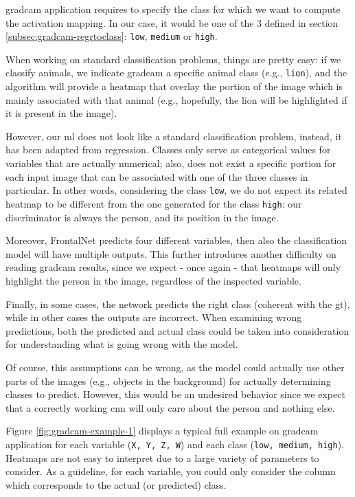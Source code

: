 \gls{gradcam} application requires to specify the class for which we want to compute the activation mapping. In our case, it would be one of the 3 defined in section \ref{subsec:gradcam-regrtoclass}: \texttt{low}, \texttt{medium} or \texttt{high}. 

When working on standard classification problems, things are pretty easy: if we classify animals, we indicate \gls{gradcam} a specific animal class (e.g., \texttt{lion}), and the algorithm will provide a heatmap that overlay the portion of the image which is mainly associated with that animal (e.g., hopefully, the lion will be highlighted if it is present in the image).

\medskip

However, our \gls{ml} does not look like a standard classification problem, instead, it has been adapted from regression. Classes only serve as categorical values for variables that are actually numerical; also, does not exist a specific portion for each input image that can be associated with one of the three classes in particular. In other words, considering the class \texttt{low}, we do not expect its related heatmap to be different from the one generated for the class \texttt{high}: our discriminator is always the person, and its position in the image.

Moreover, FrontalNet predicts four different variables, then also the classification model will have multiple outputs. This further introduces another difficulty on reading \gls{gradcam} results, since we expect - once again - that heatmaps will only highlight the person in the image, regardless of the inspected variable.

Finally, in some cases, the network predicts the right class (coherent with the \gls{gt}), while in other cases the outputs are incorrect. When examining wrong predictions, both the predicted and actual class could be taken into consideration for understanding what is going wrong with the model.

Of course, this assumptions can be wrong, as the model could actually use other parts of the images (e.g., objects in the background) for actually determining classes to predict. However, this would be an undesired behavior since we expect that a correctly working \gls{cnn} will only care about the person and nothing else.

\bigskip

Figure \ref{fig:gradcam-example-1} displays a typical full example on \gls{gradcam} application for each variable (\texttt{X, Y, Z, W}) and each class (\texttt{low, medium, high}). Heatmaps are not easy to interpret due to a large variety of parameters to consider. As a guideline, for each variable, you could only consider the column which corresponds to the actual (or predicted) class.

